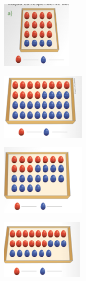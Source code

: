 \begin{mdframed}[linewidth=2pt,linecolor=salmao,roundcorner=2pt]
\begin{escolha}
{%

\begin{escolha}
\item
\includegraphics[width=1.37512in,height=1.31678in]{media/image118.png}

\item
\includegraphics[width=1.64181in,height=1.30845in]{media/image119.png}

\item
\includegraphics[width=1.63347in,height=1.39179in]{media/image120.png}

\begin{escolha}
\item
\includegraphics[width=1.60014in,height=1.16677in]{media/image121.png}
\end{escolha}


\end{escolha}}
\end{escolha}
\end{mdframed}
